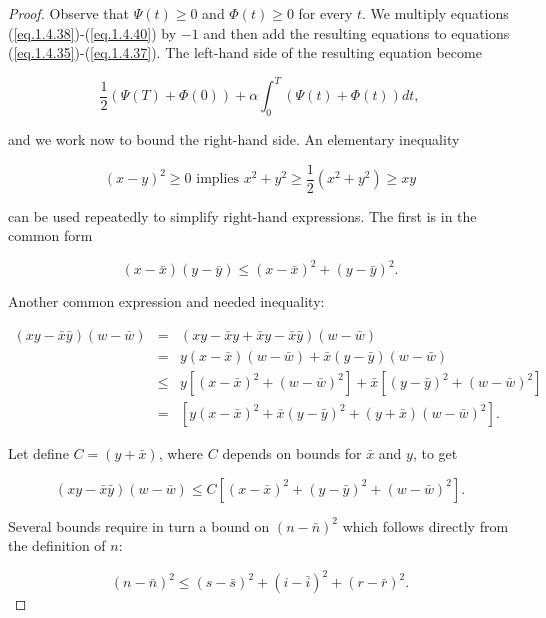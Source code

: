 \begin{proof}
Observe that $\Psi(t)\geq 0$ and $\Phi(t)\geq 0$ for every $t$. We multiply equations (\ref{eq.1.4.38})-(\ref{eq.1.4.40}) by $-1$ and then add the resulting equations to equations (\ref{eq.1.4.35})-(\ref{eq.1.4.37}). The left-hand side of the resulting equation become

\begin{equation*}
	\frac{1}{2}(\Psi(T)+\Phi(0))+\alpha\int_{0}^{T}(\Psi(t)+\Phi(t))dt,
\end{equation*}

and we work now to bound the right-hand side. An elementary inequality

\begin{equation*}
(x-y)^2\geq 0\,\,\mbox{implies}\,\, x^2+y^2\geq \frac{1}{2}(x^2+y^2)\geq xy
\end{equation*}

can be used repeatedly to simplify right-hand expressions. The first is in the common form

\begin{equation}\label{eq.1.4.41}
(x-\bar{x})(y-\bar{y})\leq (x-\bar{x})^2+(y-\bar{y})^2.
\end{equation}

Another common expression and needed inequality:

\begin{eqnarray*}
(xy-\bar{x}\bar{y})(w-\bar{w})&=& (xy-\bar{x}y+\bar{x}y-\bar{x}\bar{y})(w-\bar{w})\\
&=& y(x-\bar{x})(w-\bar{w})+\bar{x}(y-\bar{y})(w-\bar{w})\\
&\leq&y[(x-\bar{x})^2+(w-\bar{w})^2]+\bar{x}[(y-\bar{y})^2+(w-\bar{w})^2]\\
&=& [y(x-\bar{x})^2+\bar{x}(y-\bar{y})^2+(y+\bar{x})(w-\bar{w})^2].
\end{eqnarray*}

Let define $C=(y+\bar{x})$, where $C$ depends on bounds for $\bar{x}$ and $y$, to get

\begin{equation}\label{eq.1.4.42}
(xy-\bar{x}\bar{y})(w-\bar{w})\leq C[(x-\bar{x})^2+(y-\bar{y})^2+(w-\bar{w})^2].
\end{equation}

Several bounds require in turn a bound on $(n-\bar{n})^2$ which follows directly from the definition of $n$:

\begin{equation}\label{eq.1.4.43}
(n-\bar{n})^2\leq (s-\bar{s})^2+(i-\bar{i})^2+(r-\bar{r})^2.
\end{equation}


\end{proof}
